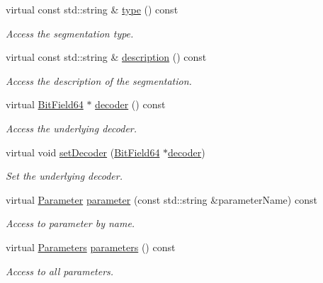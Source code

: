 \begin{DoxyCompactItemize}
virtual const std\+::string \& \hyperlink{class_d_d4hep_1_1_d_d_segmentation_1_1_segmentation_a5ec5a966ef57fbaf9484c0180aae8a03}{type} () const
\begin{DoxyCompactList}\small\item\em Access the segmentation type. \end{DoxyCompactList}\item 
virtual const std\+::string \& \hyperlink{class_d_d4hep_1_1_d_d_segmentation_1_1_segmentation_a99589a80a0ca6afaf1562b174fcd8cb5}{description} () const
\begin{DoxyCompactList}\small\item\em Access the description of the segmentation. \end{DoxyCompactList}\item 
virtual \hyperlink{class_d_d4hep_1_1_d_d_segmentation_1_1_bit_field64}{Bit\+Field64} $\ast$ \hyperlink{class_d_d4hep_1_1_d_d_segmentation_1_1_segmentation_abec3489982d0fe91ef4b142d9d755576}{decoder} () const
\begin{DoxyCompactList}\small\item\em Access the underlying decoder. \end{DoxyCompactList}\item 
virtual void \hyperlink{class_d_d4hep_1_1_d_d_segmentation_1_1_segmentation_ab5973bc06538d13b1991f55e40635fa0}{set\+Decoder} (\hyperlink{class_d_d4hep_1_1_d_d_segmentation_1_1_bit_field64}{Bit\+Field64} $\ast$\hyperlink{class_d_d4hep_1_1_d_d_segmentation_1_1_segmentation_abec3489982d0fe91ef4b142d9d755576}{decoder})
\begin{DoxyCompactList}\small\item\em Set the underlying decoder. \end{DoxyCompactList}\item 
virtual \hyperlink{namespace_d_d4hep_1_1_d_d_segmentation_af6c6bad2a745d807a0ed00506fb34ccf}{Parameter} \hyperlink{class_d_d4hep_1_1_d_d_segmentation_1_1_segmentation_a31436072c74290b541fd032efc801652}{parameter} (const std\+::string \&parameter\+Name) const
\begin{DoxyCompactList}\small\item\em Access to parameter by name. \end{DoxyCompactList}\item 
virtual \hyperlink{namespace_d_d4hep_1_1_d_d_segmentation_af38026430ca0e1ef64acdfc898f5dd3d}{Parameters} \hyperlink{class_d_d4hep_1_1_d_d_segmentation_1_1_segmentation_a1920fda919c1215aa4a76b74fd3b099b}{parameters} () const
\begin{DoxyCompactList}\small\item\em Access to all parameters. \end{DoxyCompactList}\item 

\end{DoxyCompactItemize}
